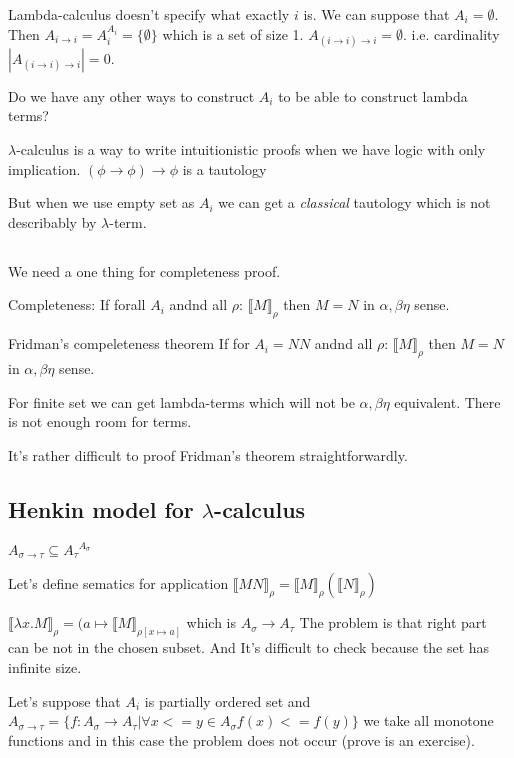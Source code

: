 \documentclass[a4paper,10pt]{book}
\newcommand{\sem}[2]{ \llbracket#1\rrbracket_{#2} }
\begin{document}
Lambda-calculus doesn't specify what exactly $i$ is. We can suppose that $A_i=\emptyset$. Then
$A_{i\rightarrow i} = A_i^{A_i} = \{ \emptyset \}$ which is a set of size 1. $A_{(i\rightarrow i)\rightarrow i} = { \emptyset }$. i.e. cardinality $|A_{(i\rightarrow i)\rightarrow i} | = 0 $.

Do we have any other ways to construct $A_i$ to be able to construct lambda terms?

$\lambda$-calculus is a way to write intuitionistic proofs when we have logic with only implication. 
 $(\phi \rightarrow \phi)\rightarrow \phi$ is a tautology

But when we use empty set as $A_i$ we can get a \textit{classical} tautology which is not describably by $\lambda$-term.

\subsection{}
We need a one thing for completeness proof.

Completeness: If forall $A_i$ andnd all $\rho$: $\sem{M}{\rho}$ then $M=N$ in 
$\alpha,\beta\eta$ sense.

Fridman's compeleteness theorem
If for $A_i=NN$ andnd all $\rho$: $\sem{M}{\rho}$ then $M=N$ in 
$\alpha,\beta\eta$ sense.

For finite set we can get lambda-terms which will not be $\alpha,\beta\eta$ equivalent. There is not enough room for terms.

It's rather difficult to proof Fridman's theorem straightforwardly.

\subsection{Henkin model for $\lambda$-calculus}
$A_{\sigma \rightarrow \tau} \subseteq {A_\tau}^{A_\sigma}$

Let's define sematics for application
$\sem{MN}{\rho} = \sem{M}{\rho}(\sem{N}{\rho})$

$\sem{\lambda x . M}{\rho} = (a \mapsto \sem{M}{\rho[x \mapsto a]}$ which is $A_\sigma \rightarrow A_\tau$
The problem is that right part can be not in the chosen subset. And It's difficult to check because the set has infinite size.

Let's suppose that $A_i$ is partially ordered set and
$A_{\sigma \rightarrow \tau} = \{ f: A_\sigma \rightarrow A_\tau | 
\forall x <= y \in A_\sigma f(x) <= f(y)\}$
we take all monotone functions and in this case the problem does not occur (prove is an exercise).
\end{document}
